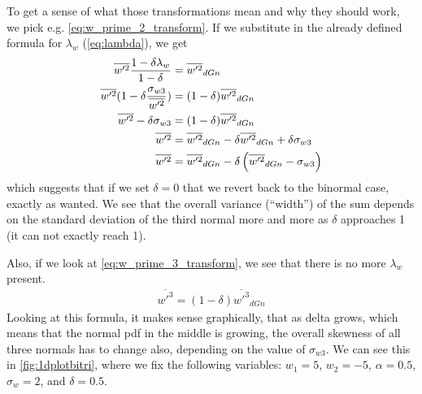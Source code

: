 To get a sense of what those transformations mean and why they should work, we pick e.g. \cref{eq:w_prime_2_transform}.
If we substitute in the already defined formula for $\lambda_w$ (\cref{eq:lambda}), we get
\begin{align*}
    \overline{w'^2} \frac{1 - \delta\lambda_w}{1 - \delta}
    &= \overline{w'^2}_{dGn} \\
    \overline{w'^2} (1 - \delta\frac{\sigma_{w 3}}{\overline{w'^2}})
    &= (1 - \delta)\overline{w'^2}_{dGn} \\
    \overline{w'^2} - \delta\sigma_{w 3}
    &= (1 - \delta)\overline{w'^2}_{dGn} \\
    \overline{w'^2}
    &= \overline{w'^2}_{dGn} - \delta\overline{w'^2}_{dGn} + \delta\sigma_{w 3} \\
    \overline{w'^2}
    &= \overline{w'^2}_{dGn} - \delta\left(\overline{w'^2}_{dGn} - \sigma_{w 3}\right)
\end{align*}
which suggests that if we set $\delta=0$ that we revert back to the binormal case, exactly as wanted.
We see that the overall variance (\enquote{width}) of the sum depends on the standard deviation of the third normal more and more as $\delta$ approaches 1 (it can not exactly reach 1).

Also, if we look at \cref{eq:w_prime_3_transform}, we see that there is no more $\lambda_w$ present.
\begin{align*}
    \overline{w'^3} = (1 - \delta)\overline{w'^3}_{dGn}
\end{align*}
Looking at this formula, it makes sense graphically, that as delta grows, which means that the normal \gls{pdf} in the middle is growing, the overall skewness of all three normals has to change also, depending on the value of $\sigma_{w 3}$.
We can see this in \autoref{fig:1dplotbitri}, where we fix the following variables: $w_1 = 5$, $w_2 = -5$, $\alpha = 0.5$, $\sigma_w = 2$, and $\delta = 0.5$.

